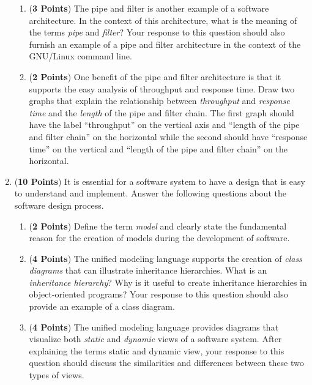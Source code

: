 \documentclass[12pt,epsf,psfig,graphics]{article}
\begin{document}
\begin{enumerate}
\begin{enumerate}
\item ({\bf 3 Points}) The pipe and filter is another example of a
  software architecture.  In the context of this architecture, what is
  the meaning of the terms {\em pipe} and {\em filter}?  Your response
  to this question should also furnish an example of a pipe and filter
  architecture in the context of the GNU/Linux command line.

\item ({\bf 2 Points}) One benefit of the pipe and filter architecture
  is that it supports the easy analysis of throughput and response
  time.  Draw two graphs that explain the relationship between {\em
    throughput} and {\em response time} and the {\em length} of the
  pipe and filter chain.  The first graph should have the label
  ``throughput'' on the vertical axis and ``length of the pipe and
  filter chain'' on the horizontal while the second should have
  ``response time'' on the vertical and ``length of the pipe and
  filter chain'' on the horizontal.

\end{enumerate}

\newpage

\item ({\bf 10 Points}) It is essential for a software system to have
  a design that is easy to understand and implement.  Answer the
  following questions about the software design process.

\begin{enumerate}

\item ({\bf 2 Points}) Define the term {\em model} and clearly state
  the fundamental reason for the creation of models during the
  development of software.

\item ({\bf 4 Points}) The unified modeling language supports the
  creation of {\em class diagrams} that can illustrate inheritance
  hierarchies.  What is an {\em inheritance hierarchy}?  Why is it
  useful to create inheritance hierarchies in object-oriented
  programs?  Your response to this question should also provide an
  example of a class diagram.

\item ({\bf 4 Points}) The unified modeling language provides
  diagrams that visualize both {\em static} and {\em dynamic} views of
  a software system.  After explaining the terms static and dynamic
  view, your response to this question should discuss the similarities
  and differences between these two types of views.


\end{enumerate}
\end{enumerate}
\end{document}
